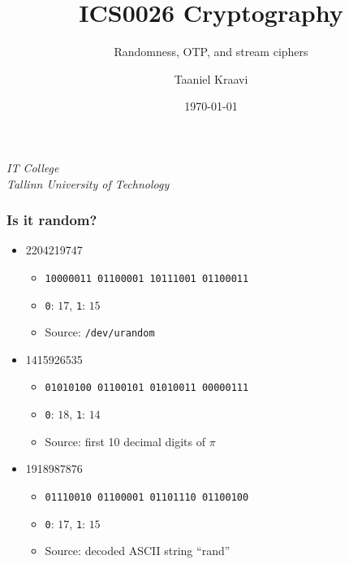 \graphicspath{ {../../images/} }
\usetikzlibrary{external}

\usepackage{crygame}

\title{ICS0026 Cryptography}
\subtitle{Randomness, OTP, and stream ciphers}
\date{\today}
\author{Taaniel Kraavi}
\institute%
{%
  \textit{IT College}\\
  \textit{Tallinn University of Technology}
}


\begin{frame}
  \titlepage
\end{frame}

\begin{frame}
  \frametitle{Is it random?}

  \begin{itemize}
    \item<1-> 2204219747
    \begin{itemize}
      \item<2-> \texttt{10000011 01100001 10111001 01100011}
      \item<2-> \texttt{0}: $17$, \texttt{1}: $15$
      \item<3-> Source: \texttt{/dev/urandom}
    \end{itemize}
    \item<1-> 1415926535
    \begin{itemize}
      \item<2-> \texttt{01010100 01100101 01010011 00000111}
      \item<2-> \texttt{0}: $18$, \texttt{1}: $14$
      \item<4-> Source: first 10 decimal digits of $\pi$
    \end{itemize}
    \item<1-> 1918987876
    \begin{itemize}
      \item<2-> \texttt{01110010 01100001 01101110 01100100}
      \item<2-> \texttt{0}: $17$, \texttt{1}: $15$
      \item<5-> Source: decoded ASCII string \enquote{rand}
    \end{itemize}
  \end{itemize}
\end{frame}

